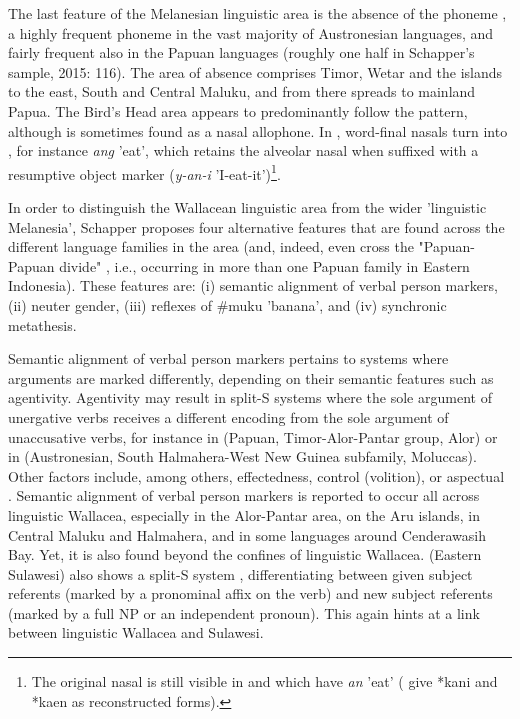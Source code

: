 The last feature of the Melanesian linguistic area is the absence of the phoneme , a highly frequent phoneme in the vast majority of Austronesian languages, and fairly frequent also in the Papuan languages (roughly one half in Schapper's sample, 2015: 116). The area of absence comprises Timor, Wetar and the islands to the east, South and Central Maluku, and from there spreads to mainland Papua. The Bird's Head area appears to predominantly follow the pattern, although  is sometimes found as a nasal allophone. In , word-final nasals turn into , for instance \textit{ang} 'eat', which retains the alveolar nasal when suffixed with a resumptive object marker (\textit{y-an-i} 'I-eat-it')\footnote{The original nasal is still visible in  and  which have \textit{an} 'eat' (\citealt{ross2008lexicon} give  *kani and  *kaen as reconstructed forms).}.

In order to distinguish the Wallacean linguistic area from the wider 'linguistic Melanesia', Schapper proposes four alternative features that are found across the different language families in the area (and, indeed, even cross the "Papuan-Papuan divide" \citep[124]{schapper2015wallacea}, i.e., occurring in more than one Papuan family in Eastern Indonesia). These features are: (i) semantic alignment of verbal person markers, (ii) neuter gender, (iii) reflexes of \#muku 'banana', and (iv) synchronic metathesis.

Semantic alignment of verbal person markers pertains to systems where arguments are marked differently, depending on their semantic features such as agentivity. Agentivity may result in split-S systems where the sole argument of unergative verbs receives a different encoding from the sole argument of unaccusative verbs, for instance in  (Papuan, Timor-Alor-Pantar group, Alor) or in  (Austronesian, South Halmahera-West New Guinea subfamily, Moluccas). Other factors include, among others, effectedness, control (volition), or aspectual \citep[125]{schapper2015wallacea}. Semantic alignment of verbal person markers is reported to occur all across linguistic Wallacea, especially in the Alor-Pantar area, on the Aru islands, in Central Maluku and Halmahera, and in some languages around Cenderawasih Bay. Yet, it is also found beyond the confines of linguistic Wallacea.  (Eastern Sulawesi) also shows a split-S system \citep{Barsel1994}, differentiating between given subject referents (marked by a pronominal affix on the verb) and new subject referents (marked by a full NP or an independent pronoun). This again hints at a link between linguistic Wallacea and Sulawesi.

